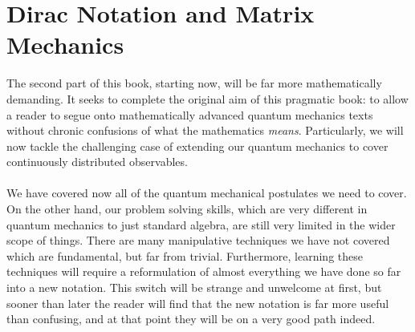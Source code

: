 \chapter{Dirac Notation and Matrix Mechanics}
The second part of this book, starting now, will be far more mathematically demanding. It seeks to complete the original aim of this pragmatic book: to allow a reader to segue onto mathematically advanced quantum mechanics texts without chronic confusions of what the mathematics \textit{means}. Particularly, we will now tackle the challenging case of extending our quantum mechanics to cover continuously distributed observables.
\\\\
We have covered now all of the quantum mechanical postulates we need to cover. On the other hand, our problem solving skills, which are very different in quantum mechanics to just standard algebra, are still very limited in the wider scope of things. There are many manipulative techniques we have not covered which are fundamental, but far from trivial. Furthermore, learning these techniques will require a reformulation of almost everything we have done so far into a new notation. This switch will be strange and unwelcome at first, but sooner than later the reader will find that the new notation is far more useful than confusing, and at that point they will be on a very good path indeed.
\\\\
